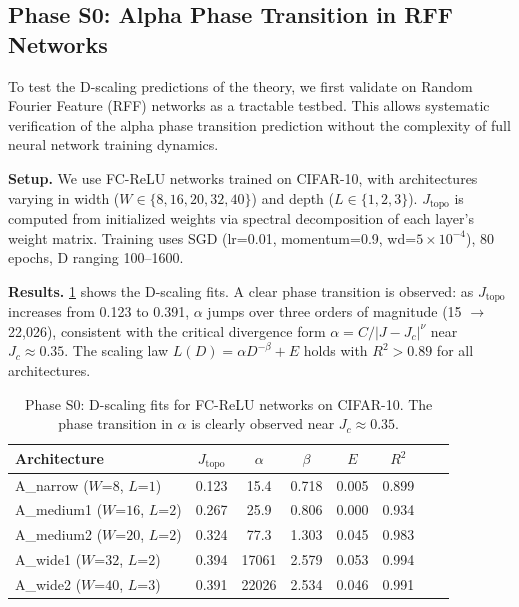 \documentclass[11pt, a4paper]{article}
\theoremstyle{definition}
\begin{document}
\subsection{Phase S0: Alpha Phase Transition in RFF Networks}
\label{sec:phase-s0}
To test the D-scaling predictions of the theory, we first validate on Random Fourier Feature (RFF) networks as a tractable testbed. This allows systematic verification of the alpha phase transition prediction without the complexity of full neural network training dynamics.

\textbf{Setup.} We use FC-ReLU networks trained on CIFAR-10, with architectures varying in width ($W \in \{8, 16, 20, 32, 40\}$) and depth ($L \in \{1, 2, 3\}$). $J_\mathrm{topo}$ is computed from initialized weights via spectral decomposition of each layer's weight matrix. Training uses SGD (lr=0.01, momentum=0.9, wd=$5\times10^{-4}$), 80 epochs, D ranging 100--1600.

\textbf{Results.} \cref{tab:phase-s0} shows the D-scaling fits. A clear phase transition is observed: as $J_\mathrm{topo}$ increases from 0.123 to 0.391, $\alpha$ jumps over three orders of magnitude (15 $\to$ 22,026), consistent with the critical divergence form $\alpha = C/|J - J_c|^\nu$ near $J_c \approx 0.35$. The scaling law $L(D) = \alpha D^{-\beta} + E$ holds with $R^2 > 0.89$ for all architectures.

\begin{table}[htbp]
\centering
\caption{Phase S0: D-scaling fits for FC-ReLU networks on CIFAR-10. The phase transition in $\alpha$ is clearly observed near $J_c \approx 0.35$.}
\label{tab:phase-s0}
\begin{tabular}{lccccccc}
\toprule
\textbf{Architecture} & $J_\mathrm{topo}$ & $\alpha$ & $\beta$ & $E$ & $R^2$ \\
\midrule
A\_narrow   ($W$=$8$, $L$=$1$)   & 0.123 & 15.4  & 0.718 & 0.005 & 0.899 \\
A\_medium1  ($W$=$16$, $L$=$2$)  & 0.267 & 25.9  & 0.806 & 0.000 & 0.934 \\
A\_medium2  ($W$=$20$, $L$=$2$)  & 0.324 & 77.3  & 1.303 & 0.045 & 0.983 \\
A\_wide1    ($W$=$32$, $L$=$2$)  & 0.394 & 17061 & 2.579 & 0.053 & 0.994 \\
A\_wide2    ($W$=$40$, $L$=$3$)  & 0.391 & 22026 & 2.534 & 0.046 & 0.991 \\
\bottomrule
\end{tabular}
\end{table}
\end{document}
